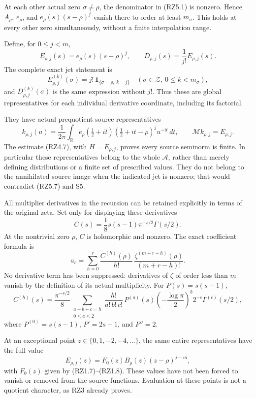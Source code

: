 \documentclass[
]{article}
\begin{document}
At each other actual zero \(\sigma\ne\rho\), the denominator in (RZ5.1)
is nonzero. Hence \(A_\rho\), \(e_\rho\), and \(e_\rho(s)(s-\rho)^j\)
vanish there to order at least \(m_\sigma\). This holds at every other
zero simultaneously, without a finite interpolation range.

Define, for \(0\leq j<m\), \[
E_{\rho,j}(s)=e_\rho(s)(s-\rho)^j,\qquad
D_{\rho,j}(s)=\frac1{j!}E_{\rho,j}(s).
\tag{RZ5.6}
\] The complete exact jet statement is \[
E_{\rho,j}^{(k)}(\sigma)
=j!\,\mathbf1_{\{\sigma=\rho,\ k=j\}}
\quad(\sigma\in\mathscr Z,\ 0\leq k<m_\sigma),
\tag{RZ5.7}
\] and \(D_{\rho,j}^{(k)}(\sigma)\) is the same expression without
\(j!\). Thus these are global representatives for each individual
derivative coordinate, including its factorial.

They have actual prequotient source representatives \[
k_{\rho,j}(u)=\frac1{2\pi}\int_{\mathbb R}
e_\rho(\tfrac12+it)(\tfrac12+it-\rho)^j u^{-it}\,dt,
\qquad \mathcal Mk_{\rho,j}=E_{\rho,j}.
\tag{RZ5.8}
\] The estimate (RZ4.7), with \(H=E_{\rho,j}\), proves every source
seminorm is finite. In particular these representatives belong to the
whole \(\mathcal A\), rather than merely defining distributions or a
finite set of prescribed values. They do not belong to the annihilated
source image when the indicated jet is nonzero; that would contradict
(RZ5.7) and S5.

All multiplier derivatives in the recursion can be retained explicitly
in terms of the original zeta. Set only for displaying these derivatives
\[
C(s)=\frac18s(s-1)\pi^{-s/2}\Gamma(s/2).
\tag{RZ5.9}
\] At the nontrivial zero \(\rho\), \(C\) is holomorphic and nonzero.
The exact coefficient formula is \[
a_r=
\sum_{h=0}^r
\frac{C^{(h)}(\rho)}{h!}\,
\frac{\zeta^{(m+r-h)}(\rho)}{(m+r-h)!}.
\tag{RZ5.10}
\] No derivative term has been suppressed: derivatives of \(\zeta\) of
order less than \(m\) vanish by the definition of its actual
multiplicity. For \(P(s)=s(s-1)\), \[
C^{(h)}(s)
=\frac{\pi^{-s/2}}8
\sum_{\substack{a+b+c=h\\0\leq a\leq2}}
\frac{h!}{a!\,b!\,c!}\,
P^{(a)}(s)
\left(-\frac{\log\pi}{2}\right)^b
2^{-c}\Gamma^{(c)}(s/2),
\tag{RZ5.11}
\] where \(P^{(0)}=s(s-1)\), \(P'=2s-1\), and \(P''=2\).

At an exceptional point \(z\in\{0,1,-2,-4,\ldots\}\), the same entire
representatives have the full value \[
E_{\rho,j}(z)=F_0(z)B_\rho(z)(z-\rho)^{j-m},
\tag{RZ5.12}
\] with \(F_0(z)\) given by (RZ1.7)--(RZ1.8). These values have not been
forced to vanish or removed from the source functions. Evaluation at
these points is not a quotient character, as RZ3 already proves.
\end{document}
